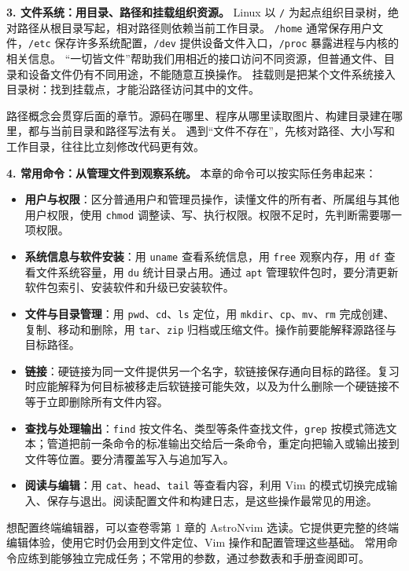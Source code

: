 \textbf{3. 文件系统：用目录、路径和挂载组织资源。}
Linux 以 \texttt{/} 为起点组织目录树，绝对路径从根目录写起，相对路径则依赖当前工作目录。
\texttt{/home} 通常保存用户文件，\texttt{/etc} 保存许多系统配置，\texttt{/dev} 提供设备文件入口，\texttt{/proc} 暴露进程与内核的相关信息。
“一切皆文件”帮助我们用相近的接口访问不同资源，但普通文件、目录和设备文件仍有不同用途，不能随意互换操作。
挂载则是把某个文件系统接入目录树：找到挂载点，才能沿路径访问其中的文件。

路径概念会贯穿后面的章节。源码在哪里、程序从哪里读取图片、构建目录建在哪里，都与当前目录和路径写法有关。
遇到“文件不存在”，先核对路径、大小写和工作目录，往往比立刻修改代码更有效。

\textbf{4. 常用命令：从管理文件到观察系统。}
本章的命令可以按实际任务串起来：
\begin{itemize}
    \item \textbf{用户与权限}：区分普通用户和管理员操作，读懂文件的所有者、所属组与其他用户权限，使用 \texttt{chmod} 调整读、写、执行权限。权限不足时，先判断需要哪一项权限。
    \item \textbf{系统信息与软件安装}：用 \texttt{uname} 查看系统信息，用 \texttt{free} 观察内存，用 \texttt{df} 查看文件系统容量，用 \texttt{du} 统计目录占用。通过 \texttt{apt} 管理软件包时，要分清更新软件包索引、安装软件和升级已安装软件。
    \item \textbf{文件与目录管理}：用 \texttt{pwd}、\texttt{cd}、\texttt{ls} 定位，用 \texttt{mkdir}、\texttt{cp}、\texttt{mv}、\texttt{rm} 完成创建、复制、移动和删除，用 \texttt{tar}、\texttt{zip} 归档或压缩文件。操作前要能解释源路径与目标路径。
    \item \textbf{链接}：硬链接为同一文件提供另一个名字，软链接保存通向目标的路径。复习时应能解释为何目标被移走后软链接可能失效，以及为什么删除一个硬链接不等于立即删除所有文件内容。
    \item \textbf{查找与处理输出}：\texttt{find} 按文件名、类型等条件查找文件，\texttt{grep} 按模式筛选文本；管道把前一条命令的标准输出交给后一条命令，重定向把输入或输出接到文件等位置。要分清覆盖写入与追加写入。
    \item \textbf{阅读与编辑}：用 \texttt{cat}、\texttt{head}、\texttt{tail} 等查看内容，利用 Vim 的模式切换完成输入、保存与退出。阅读配置文件和构建日志，是这些操作最常见的用途。
\end{itemize}
想配置终端编辑器，可以查卷零第 1 章的 AstroNvim 选读。它提供更完整的终端编辑体验，使用它时仍会用到文件定位、Vim 操作和配置管理这些基础。
常用命令应练到能够独立完成任务；不常用的参数，通过参数表和手册查阅即可。

